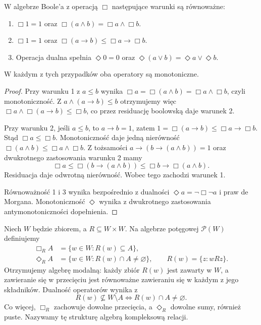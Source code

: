 \begin{stwierdzenie}
\label{prop:ncl-modal-algebra-normal}
W algebrze Boole'a z operacją $\Box$ następujące
warunki są równoważne:
\begin{enumerate}
\item $\Box1=1$ oraz $\Box(a\wedge b)=\Box a\wedge\Box b$.
\item $\Box1=1$ oraz
      $\Box(a\to b)\leq\Box a\to\Box b$.
\item Operacja dualna spełnia $\Diamond0=0$ oraz
      $\Diamond(a\vee b)=\Diamond a\vee\Diamond b$.
\end{enumerate}
W każdym z tych przypadków oba operatory są
monotoniczne.
\end{stwierdzenie}
\begin{proof}
Przy warunku 1 z $a\leq b$ wynika
$\Box a=\Box(a\wedge b)=\Box a\wedge\Box b$,
czyli monotoniczność. Z
$a\wedge(a\to b)\leq b$ otrzymujemy więc
$\Box a\wedge\Box(a\to b)\leq\Box b$,
co przez residuację boolowską daje warunek 2.

Przy warunku 2, jeśli $a\leq b$, to $a\to b=1$,
zatem $1=\Box(a\to b)\leq\Box a\to\Box b$.
Stąd $\Box a\leq\Box b$.
Monotoniczność daje jedną nierówność
$\Box(a\wedge b)\leq\Box a\wedge\Box b$.
Z tożsamości $a\to(b\to(a\wedge b))=1$
oraz dwukrotnego zastosowania warunku 2 mamy
\[
 \Box a\leq\Box(b\to(a\wedge b))
        \leq\Box b\to\Box(a\wedge b).
\]
Residuacja daje odwrotną nierówność.
Wobec tego zachodzi warunek 1.

Równoważność 1 i 3 wynika bezpośrednio
z dualności $\Diamond a=\neg\Box\neg a$
i praw de Morgana. Monotoniczność $\Diamond$
wynika z dwukrotnego zastosowania
antymonotoniczności dopełnienia.
\end{proof}

\begin{przyklad}
\label{ex:ncl-modal-complex-algebra}
Niech $W$ będzie zbiorem, a $R\subseteq W\times W$.
Na algebrze potęgowej $\mathcal P(W)$ definiujemy
\[
\begin{aligned}
 \Box_R A&=\{w\in W:R(w)\subseteq A\},\\
 \Diamond_R A&=\{w\in W:R(w)\cap A\ne\varnothing\},
 \qquad R(w)=\{z:wRz\}.
\end{aligned}
\]
Otrzymujemy algebrę modalną: każdy zbiór $R(w)$
jest zawarty w $W$, a zawieranie się w przecięciu
jest równoważne zawieraniu się w każdym z jego
składników. Dualność operatorów wynika z
\[
 R(w)\not\subseteq W\setminus A
 \iff R(w)\cap A\ne\varnothing.
\]
Co więcej, $\Box_R$ zachowuje dowolne przecięcia,
a $\Diamond_R$ dowolne sumy, również puste.
Nazywamy tę strukturę algebrą kompleksową relacji.
\end{przyklad}

